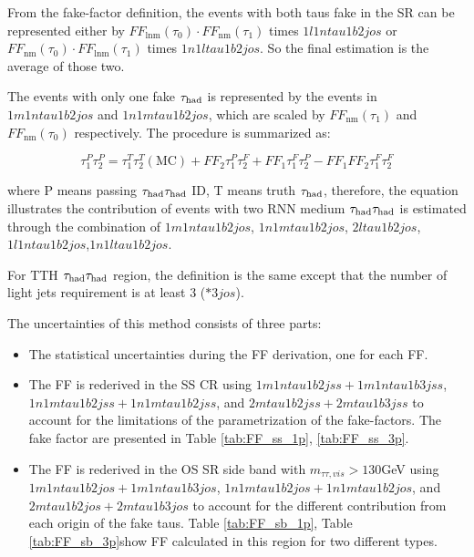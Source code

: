 From the fake-factor definition, the events with both taus fake in the SR can be represented either by $F F_{\operatorname{lnm}}\left(\tau_{0}\right) \cdot F F_{\mathrm{nm}}\left(\tau_{1}\right)$ times $1l1ntau1b2jos$ or $F F_{\mathrm{nm}}\left(\tau_{0}\right) \cdot F F_{\mathrm{lnm}}\left(\tau_{1}\right)$ times $1n1ltau1b2jos$. So the final estimation is the average of those two.

The events with only one fake $\tau_\text{had}$ is represented by the events in $1m1ntau1b2jos$ and $1n1mtau1b2jos$, which are scaled by $F F_{\mathrm{nm}}\left(\tau_{1}\right)$ and $F F_{\mathrm{nm}}\left(\tau_{0}\right)$ respectively. The procedure is summarized as:

\begin{equation}
\tau_{1}^{P} \tau_{2}^{P}=\tau_{1}^{T} \tau_{2}^{T}(\mathrm{MC})+F F_{2} \tau_{1}^{P} \tau_{2}^{F}+F F_{1} \tau_{1}^{F} \tau_{2}^{P}-F F_{1} F F_{2} \tau_{1}^{F} \tau_{2}^{F}
\end{equation}

where P means passing $\tau_\text{had}{}\tau_\text{had}$ ID, T means truth $\tau_\text{had}$, therefore, the equation illustrates the contribution of events with two RNN medium $\tau_\text{had}{}\tau_\text{had}$ is estimated through the combination of $1m1ntau1b2jos$, $1n1mtau1b2jos$, $2ltau1b2jos$,$1l1ntau1b2jos$,$1n1ltau1b2jos$.

For TTH $\tau_\text{had}{}\tau_\text{had}$ region, the definition is the same except that the number of light jets requirement is at least 3 ($*3jos$). 

The uncertainties of this method consists of three parts:
\begin{itemize}

\item The statistical uncertainties during the FF derivation, one for each FF.

\item The FF is rederived in the SS CR using $1m1ntau1b2jss+1m1ntau1b3jss$, $1n1mtau1b2jss+1n1mtau1b2jss$, and $2mtau1b2jss+2mtau1b3jss$ to account for the limitations of the parametrization of the fake-factors. The fake factor are presented in Table \ref{tab:FF_ss_1p}, \ref{tab:FF_ss_3p}.

\item The FF is rederived in the OS SR side band with $m_{\tau\tau,vis}>130$GeV using $1m1ntau1b2jos+1m1ntau1b3jos$, $1n1mtau1b2jos+1n1mtau1b2jos$, and $2mtau1b2jos+2mtau1b3jos$ to account for the different contribution from each origin of the fake taus. Table \ref{tab:FF_sb_1p}, Table \ref{tab:FF_sb_3p}show FF calculated in this region for two different types.

\end{itemize}

